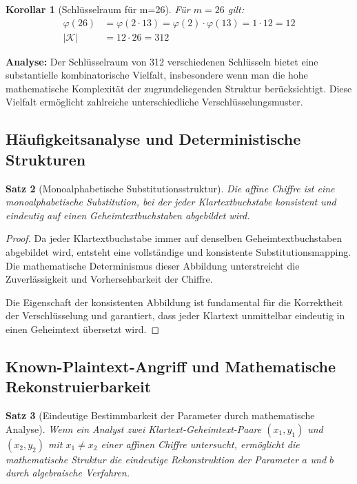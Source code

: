﻿\documentclass[12pt,a4paper]{article}
\newtheorem{theorem}{Satz}
\newtheorem{corollary}[theorem]{Korollar}
\begin{document}
	\begin{corollary}[Schlüsselraum für m=26]
		Für $m = 26$ gilt:
		\begin{align}
			\varphi(26) &= \varphi(2 \cdot 13) = \varphi(2) \cdot \varphi(13) = 1 \cdot 12 = 12 \\
			|\mathcal{K}| &= 12 \cdot 26 = 312
		\end{align}
	\end{corollary}
	
	\textbf{Analyse:} Der Schlüsselraum von 312 verschiedenen Schlüsseln bietet eine substantielle kombinatorische Vielfalt, insbesondere wenn man die hohe mathematische Komplexität der zugrundeliegenden Struktur berücksichtigt. Diese Vielfalt ermöglicht zahlreiche unterschiedliche Verschlüsselungsmuster.
	
	\subsection{Häufigkeitsanalyse und Deterministische Strukturen}
	
	\begin{theorem}[Monoalphabetische Substitutionsstruktur]
		Die affine Chiffre ist eine monoalphabetische Substitution, bei der jeder Klartextbuchstabe konsistent und eindeutig auf einen Geheimtextbuchstaben abgebildet wird.
	\end{theorem}
	
	\begin{proof}
		Da jeder Klartextbuchstabe immer auf denselben Geheimtextbuchstaben abgebildet wird, entsteht 
		eine vollständige und konsistente Substitutionsmapping. Die mathematische Determinismus dieser Abbildung unterstreicht die Zuverlässigkeit und Vorhersehbarkeit der Chiffre.
		
		Die Eigenschaft der konsistenten Abbildung ist fundamental für die Korrektheit der Verschlüsselung und garantiert, dass jeder Klartext unmittelbar eindeutig in einen Geheimtext übersetzt wird.
	\end{proof}
	
	\subsection{Known-Plaintext-Angriff und Mathematische Rekonstruierbarkeit}
	
	\begin{theorem}[Eindeutige Bestimmbarkeit der Parameter durch mathematische Analyse]
		Wenn ein Analyst zwei Klartext-Geheimtext-Paare $(x_1, y_1)$ und $(x_2, y_2)$ mit $x_1 \neq x_2$ einer affinen Chiffre untersucht, ermöglicht die mathematische Struktur die eindeutige Rekonstruktion der Parameter $a$ und $b$ durch algebraische Verfahren.
	\end{theorem}
	
\end{document}
